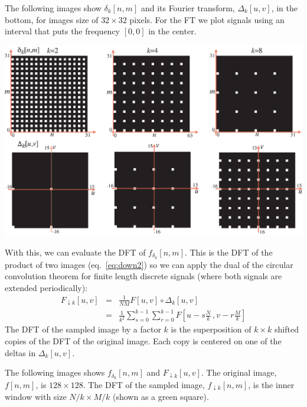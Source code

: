 The following images show $\delta_k \left[n,m\right]$ and its Fourier transform, $\Delta_k \left[u,v\right]$, in the bottom, for images size of $32 \times 32$ pixels. For the FT we  plot signals using an interval that puts the frequency $[0,0]$ in the center.

\begin{center}
  \includegraphics[width=1\linewidth]{figures/upsamplig_downsampling/discrete_delta_train.eps}
\end{center}


With this, we can evaluate the DFT of $f_{\delta_k} \left[n,m\right]$. This is the DFT of the product of two images (eq.~\ref{eq:down2}) so we can apply the dual of the circular convolution theorem for finite length discrete signals (where both signals are extended periodically):
\begin{eqnarray}
  F_{\downarrow k} \left[u,v\right] &=& \frac{1}{NM} F \left[u,v\right] \circ \Delta_k \left[u,v\right] \\ \nonumber
  &=& \frac{1}{k^2} \sum_{s=0}^{k-1} \sum_{r=0}^{k-1} F \left[u - s\frac{N}{k} \, ,v - r\frac{M}{k} \right]
\end{eqnarray}
The DFT of the sampled image by a factor $k$ is the superposition of $k \times k$ shifted copies of the DFT of the original image. Each copy is centered on one of the deltas in $\Delta_k \left[u,v\right]$.

The following images shows $f_{\delta_k} \left[n,m\right]$ and $F_{\downarrow k} \left[u,v\right]$. The original image, $f \left[n,m\right]$, is $128 \times 128$. The DFT of the sampled image, $f_{\downarrow k} \left[n,m\right]$, is the inner window with size $N/k \times M/k$ (shown as a green square).

